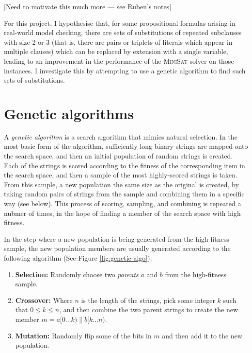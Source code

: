 \documentclass[proof,pdftex,11pt,a4]{article}
\begin{document}
[Need to motivate this much more --- see Ruben's notes]

For this project, I hypothesise that, for some propositional formulas arising in real-world model checking, there are sets of substitutions of repeated subclauses with size 2 or 3 (that is, there are pairs or triplets of literals which appear in multiple clauses) which can be replaced by extension with a single variable, leading to an improvement in the performance of the \textsc{MiniSat} solver on those instances. I investigate this by attempting to use a genetic algorithm to find such sets of substitutions.

\section{Genetic algorithms}

A \emph{genetic algorithm} is a search algorithm that mimics natural selection. In the most basic form of the algorithm, sufficiently long binary strings are mapped onto the search space, and then an initial population of random strings is created. Each of the strings is scored according to the fitness of the corresponding item in the search space, and then a sample of the most highly-scored strings is taken. From this sample, a new population the same size as the original is created, by taking random pairs of strings from the sample and combining them in a specific way (see below). This process of scoring, sampling, and combining is repeated a nubmer of times, in the hope of finding a member of the search space with high fitness.

In the step where a new population is being generated from the high-fitness sample, the new population members are usually generated according to the following algorithm (See Figure \ref{fig:genetic-algo}):

\begin{enumerate}
  \item {\bf Selection:} Randomly choose two \emph{parents} $a$ and $b$ from the high-fitness sample.
  \item {\bf Crossover:} Where $n$ is the length of the strings, pick some integer $k$ such that $0 \leq k \leq n$, and then combine the two parent strings to create the new member $m = a[0 \ldots k) \parallel b[k \ldots n)$.
  \item {\bf Mutation:} Randomly flip some of the bits in $m$ and then add it to the new population.
\end{enumerate}
\end{document}
